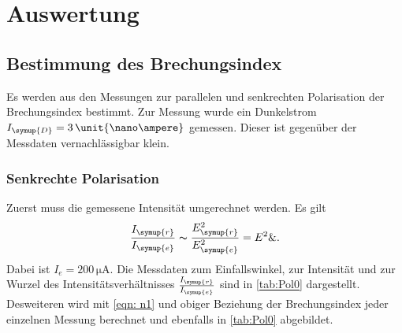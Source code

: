 \section{Auswertung}
\label{sec:Auswertung}



\subsection{Bestimmung des Brechungsindex}
Es werden aus den Messungen zur parallelen und senkrechten Polarisation der Brechungsindex bestimmt. Zur Messung wurde ein Dunkelstrom 
$I_{\symup{D}} = 3\,\unit{\nano\ampere}$ gemessen. Dieser ist gegenüber der Messdaten vernachlässigbar klein.

\subsubsection{Senkrechte Polarisation}
Zuerst muss die gemessene Intensität umgerechnet werden. Es gilt
\begin{equation}
  \frac{I_{\symup{r}}}{I_{\symup{e}}} \thicksim \frac{E_{\symup{r}}^2}{E_{\symup{e}}^2} = E^2 \& .
    \label{eqn:energie}
\end{equation}
Dabei ist $I_e = 200 \, \unit{\micro\ampere}$. Die Messdaten zum Einfallswinkel, zur Intensität und zur Wurzel des Intensitätsverhältnisses 
$\frac{I_{\symup{r}}}{I_{\symup{e}}}$ sind in \autoref{tab:Pol0} dargestellt.
Desweiteren wird mit \autoref{eqn: n1} und obiger Beziehung der Brechungsindex jeder einzelnen Messung berechnet und ebenfalls in \autoref{tab:Pol0} abgebildet.

